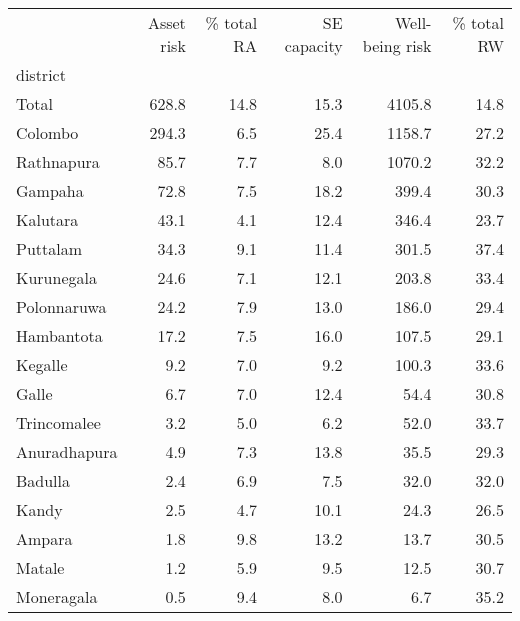 \begin{tabular}{lrrrrr}
\toprule
{} &  Asset risk &  \% total RA &  SE capacity &  Well-being risk &  \% total RW \\
district     &             &             &              &                  &             \\
\midrule
Total        &       628.8 &        14.8 &         15.3 &           4105.8 &        14.8 \\
Colombo      &       294.3 &         6.5 &         25.4 &           1158.7 &        27.2 \\
Rathnapura   &        85.7 &         7.7 &          8.0 &           1070.2 &        32.2 \\
Gampaha      &        72.8 &         7.5 &         18.2 &            399.4 &        30.3 \\
Kalutara     &        43.1 &         4.1 &         12.4 &            346.4 &        23.7 \\
Puttalam     &        34.3 &         9.1 &         11.4 &            301.5 &        37.4 \\
Kurunegala   &        24.6 &         7.1 &         12.1 &            203.8 &        33.4 \\
Polonnaruwa  &        24.2 &         7.9 &         13.0 &            186.0 &        29.4 \\
Hambantota   &        17.2 &         7.5 &         16.0 &            107.5 &        29.1 \\
Kegalle      &         9.2 &         7.0 &          9.2 &            100.3 &        33.6 \\
Galle        &         6.7 &         7.0 &         12.4 &             54.4 &        30.8 \\
Trincomalee  &         3.2 &         5.0 &          6.2 &             52.0 &        33.7 \\
Anuradhapura &         4.9 &         7.3 &         13.8 &             35.5 &        29.3 \\
Badulla      &         2.4 &         6.9 &          7.5 &             32.0 &        32.0 \\
Kandy        &         2.5 &         4.7 &         10.1 &             24.3 &        26.5 \\
Ampara       &         1.8 &         9.8 &         13.2 &             13.7 &        30.5 \\
Matale       &         1.2 &         5.9 &          9.5 &             12.5 &        30.7 \\
Moneragala   &         0.5 &         9.4 &          8.0 &              6.7 &        35.2 \\

\end{tabular}
